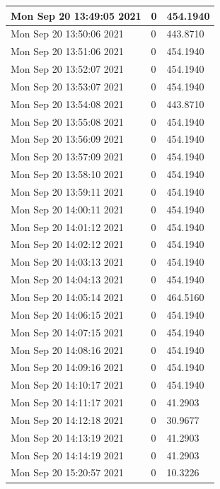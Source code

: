 \begin{longtable}{|l|l|l|}
Mon Sep 20 13:49:05 2021 &                  0 &        454.1940 \\ \hline
Mon Sep 20 13:50:06 2021 &                  0 &        443.8710 \\ \hline
Mon Sep 20 13:51:06 2021 &                  0 &        454.1940 \\ \hline
Mon Sep 20 13:52:07 2021 &                  0 &        454.1940 \\ \hline
Mon Sep 20 13:53:07 2021 &                  0 &        454.1940 \\ \hline
Mon Sep 20 13:54:08 2021 &                  0 &        443.8710 \\ \hline
Mon Sep 20 13:55:08 2021 &                  0 &        454.1940 \\ \hline
Mon Sep 20 13:56:09 2021 &                  0 &        454.1940 \\ \hline
Mon Sep 20 13:57:09 2021 &                  0 &        454.1940 \\ \hline
Mon Sep 20 13:58:10 2021 &                  0 &        454.1940 \\ \hline
Mon Sep 20 13:59:11 2021 &                  0 &        454.1940 \\ \hline
Mon Sep 20 14:00:11 2021 &                  0 &        454.1940 \\ \hline
Mon Sep 20 14:01:12 2021 &                  0 &        454.1940 \\ \hline
Mon Sep 20 14:02:12 2021 &                  0 &        454.1940 \\ \hline
Mon Sep 20 14:03:13 2021 &                  0 &        454.1940 \\ \hline
Mon Sep 20 14:04:13 2021 &                  0 &        454.1940 \\ \hline
Mon Sep 20 14:05:14 2021 &                  0 &        464.5160 \\ \hline
Mon Sep 20 14:06:15 2021 &                  0 &        454.1940 \\ \hline
Mon Sep 20 14:07:15 2021 &                  0 &        454.1940 \\ \hline
Mon Sep 20 14:08:16 2021 &                  0 &        454.1940 \\ \hline
Mon Sep 20 14:09:16 2021 &                  0 &        454.1940 \\ \hline
Mon Sep 20 14:10:17 2021 &                  0 &        454.1940 \\ \hline
Mon Sep 20 14:11:17 2021 &                  0 &         41.2903 \\ \hline
Mon Sep 20 14:12:18 2021 &                  0 &         30.9677 \\ \hline
Mon Sep 20 14:13:19 2021 &                  0 &         41.2903 \\ \hline
Mon Sep 20 14:14:19 2021 &                  0 &         41.2903 \\ \hline
Mon Sep 20 15:20:57 2021 &                  0 &         10.3226 \\ \hline

\end{longtable}


